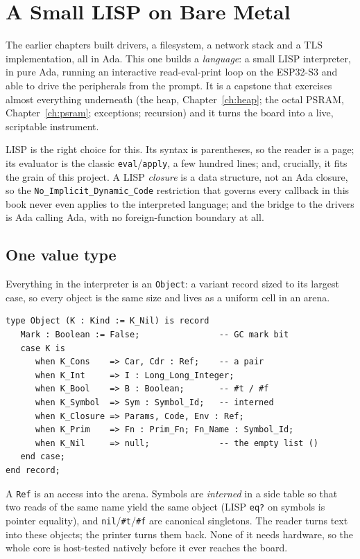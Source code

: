 \chapter{A Small LISP on Bare Metal}
\label{ch:lisp}

The earlier chapters built drivers, a filesystem, a network stack and a TLS
implementation, all in Ada. This one builds a \emph{language}: a small LISP
interpreter, in pure Ada, running an interactive read-eval-print loop on the
ESP32-S3 and able to drive the peripherals from the prompt. It is a capstone that
exercises almost everything underneath (the heap, Chapter~\ref{ch:heap}; the
octal PSRAM, Chapter~\ref{ch:psram}; exceptions; recursion) and it turns the
board into a live, scriptable instrument.

LISP is the right choice for this. Its syntax is parentheses, so the reader is a
page; its evaluator is the classic \texttt{eval}/\texttt{apply}, a few hundred
lines; and, crucially, it fits the grain of this project. A LISP \emph{closure}
is a data structure, not an Ada closure, so the \texttt{No\_Implicit\_Dynamic\_Code}
restriction that governs every callback in this book never even applies to the
interpreted language; and the bridge to the drivers is Ada calling Ada, with no
foreign-function boundary at all.

\section{One value type}

Everything in the interpreter is an \texttt{Object}: a variant record sized to its
largest case, so every object is the same size and lives as a uniform cell in an
arena.

\begin{lstlisting}
type Object (K : Kind := K_Nil) is record
   Mark : Boolean := False;                -- GC mark bit
   case K is
      when K_Cons    => Car, Cdr : Ref;    -- a pair
      when K_Int     => I : Long_Long_Integer;
      when K_Bool    => B : Boolean;       -- #t / #f
      when K_Symbol  => Sym : Symbol_Id;   -- interned
      when K_Closure => Params, Code, Env : Ref;
      when K_Prim    => Fn : Prim_Fn; Fn_Name : Symbol_Id;
      when K_Nil     => null;              -- the empty list ()
   end case;
end record;
\end{lstlisting}

A \texttt{Ref} is an access into the arena. Symbols are \emph{interned} in a side
table so that two reads of the same name yield the same object (LISP \texttt{eq?}
on symbols is pointer equality), and \texttt{nil}/\texttt{\#t}/\texttt{\#f} are
canonical singletons. The reader turns text into these objects; the printer turns
them back. None of it needs hardware, so the whole core is host-tested natively
before it ever reaches the board.

